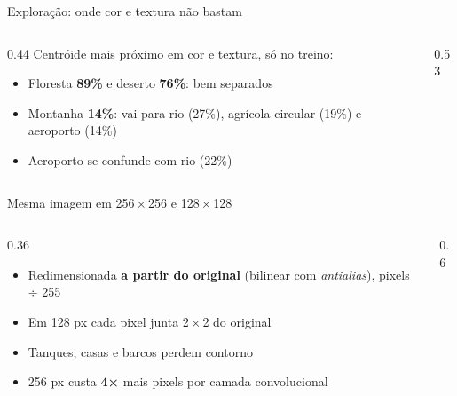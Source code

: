\documentclass[aspectratio=169,10pt,t]{beamer}
\begin{document}
\begin{frame}{Exploração: onde cor e textura não bastam}
\begin{columns}[T]
\begin{column}{0.44\textwidth}
Centróide mais próximo em cor e textura, só no treino:
\begin{itemize}
\item Floresta \textbf{89\%} e deserto \textbf{76\%}: bem separados
\item Montanha \textbf{14\%}: vai para rio (27\%), agrícola circular (19\%) e aeroporto (14\%)
\item Aeroporto se confunde com rio (22\%)
\end{itemize}
\vskip2mm
\end{column}
\begin{column}{0.53\textwidth}
\centering{}
\end{column}
\end{columns}
\end{frame}

\begin{frame}{Mesma imagem em 256\,×\,256 e 128\,×\,128}
\begin{columns}[T]
\begin{column}{0.36\textwidth}
\begin{itemize}
\item Redimensionada \textbf{a partir do original} (bilinear com \textit{antialias}), pixels ÷ 255
\item Em 128 px cada pixel junta 2\,×\,2 do original
\item Tanques, casas e barcos perdem contorno
\item 256 px custa \textbf{4×} mais pixels por camada convolucional
\end{itemize}
\end{column}
\begin{column}{0.6\textwidth}
\centering{}
\end{column}
\end{columns}
\end{frame}
\end{document}
